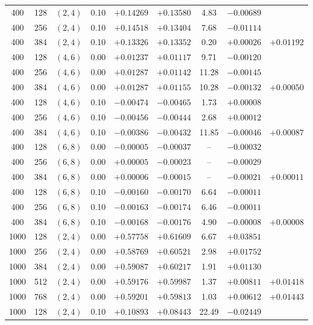 \begin{table}[!htbp]
\begin{tabular}{@{}ccccccccc@{}}
\hline
400  & 128 & $(2,4)$ & 0.10 & $+0.14269$ & $+0.13580$ &  4.83 & $-0.00689$ &  \\
400  & 256 & $(2,4)$ & 0.10 & $+0.14518$ & $+0.13404$ &  7.68 & $-0.01114$ &  \\
400  & 384 & $(2,4)$ & 0.10 & $+0.13326$ & $+0.13352$ &  0.20 & $+0.00026$ & $+0.01192$ \\
\hline
400  & 128 & $(4,6)$ & 0.00 & $+0.01237$ & $+0.01117$ &  9.71 & $-0.00120$ &  \\
400  & 256 & $(4,6)$ & 0.00 & $+0.01287$ & $+0.01142$ & 11.28 & $-0.00145$ &  \\
400  & 384 & $(4,6)$ & 0.00 & $+0.01287$ & $+0.01155$ & 10.28 & $-0.00132$ & $+0.00050$ \\
\hline
400  & 128 & $(4,6)$ & 0.10 & $-0.00474$ & $-0.00465$ &  1.73 & $+0.00008$ &  \\
400  & 256 & $(4,6)$ & 0.10 & $-0.00456$ & $-0.00444$ &  2.68 & $+0.00012$ &  \\
400  & 384 & $(4,6)$ & 0.10 & $-0.00386$ & $-0.00432$ & 11.85 & $-0.00046$ & $+0.00087$ \\
\hline
400  & 128 & $(6,8)$ & 0.00 & $-0.00005$ & $-0.00037$ & -- & $-0.00032$ &  \\
400  & 256 & $(6,8)$ & 0.00 & $+0.00005$ & $-0.00023$ & -- & $-0.00029$ &  \\
400  & 384 & $(6,8)$ & 0.00 & $+0.00006$ & $-0.00015$ & -- & $-0.00021$ & $+0.00011$ \\
\hline
400  & 128 & $(6,8)$ & 0.10 & $-0.00160$ & $-0.00170$ &  6.64 & $-0.00011$ &  \\
400  & 256 & $(6,8)$ & 0.10 & $-0.00163$ & $-0.00174$ &  6.46 & $-0.00011$ &  \\
400  & 384 & $(6,8)$ & 0.10 & $-0.00168$ & $-0.00176$ &  4.90 & $-0.00008$ & $+0.00008$ \\
\hline
1000 & 128 & $(2,4)$ & 0.00 & $+0.57758$ & $+0.61609$ &  6.67 & $+0.03851$ &  \\
1000 & 256 & $(2,4)$ & 0.00 & $+0.58769$ & $+0.60521$ &  2.98 & $+0.01752$ &  \\
1000 & 384 & $(2,4)$ & 0.00 & $+0.59087$ & $+0.60217$ &  1.91 & $+0.01130$ &  \\
1000 & 512 & $(2,4)$ & 0.00 & $+0.59176$ & $+0.59987$ &  1.37 & $+0.00811$ & $+0.01418$ \\
1000 & 768 & $(2,4)$ & 0.00 & $+0.59201$ & $+0.59813$ &  1.03 & $+0.00612$ & $+0.01443$ \\
\hline
1000 & 128 & $(2,4)$ & 0.10 & $+0.10893$ & $+0.08443$ & 22.49 & $-0.02449$ &  \\

\end{tabular}
\end{table}
